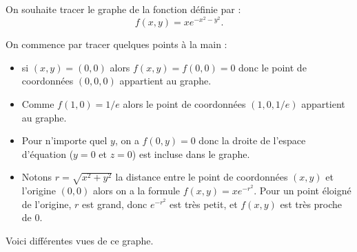 \documentclass[11pt,class=report,crop=false]{standalone}
\begin{document}
\begin{exemple}
On souhaite tracer le graphe de la fonction définie par :
$$f(x,y) = x  e^{-x^2-y^2}.$$

On commence par tracer quelques points à la main :
\begin{itemize}
  \item si $(x,y) = (0,0)$ alors $f(x,y) = f(0,0) = 0$ donc le point de coordonnées $(0,0,0)$ appartient au graphe.
  \item Comme $f(1,0) = 1/e$ alors le point de coordonnées $(1,0,1/e)$ appartient au graphe.
  \item Pour n'importe quel $y$, on a $f(0,y)=0$ donc la droite de l'espace d'équation ($y=0$ et $z=0$) est incluse dans le graphe.
  \item Notons $r = \sqrt{x^2+y^2}$ la distance entre le point de coordonnées $(x,y)$ et l'origine $(0,0)$ alors on a la formule $f(x,y) = x e^{-r^2}$. Pour un point éloigné de l'origine, $r$ est grand, donc  $e^{-r^2}$ est très petit, et $f(x,y)$ est très proche de $0$.
\end{itemize}


Voici différentes vues de ce graphe.


\end{exemple}
\end{document}

